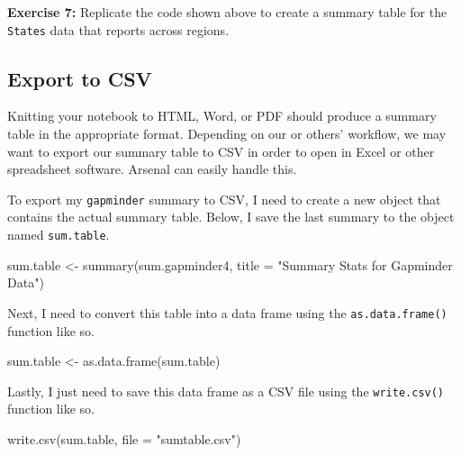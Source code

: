 \documentclass[
]{book}
\makeatletter
\newenvironment{Shaded}{\begin{snugshade}}{\end{snugshade}}
\newcommand{\AttributeTok}[1]{\textcolor[rgb]{0.61,0.61,0.61}{#1}}
\newcommand{\FunctionTok}[1]{\textcolor[rgb]{0,0,0}{#1}}
\newcommand{\NormalTok}[1]{#1}
\newcommand{\OtherTok}[1]{\textcolor[rgb]{0.37,0.37,0.37}{#1}}
\newcommand{\StringTok}[1]{\textcolor[rgb]{0.5,0.5,0.5}{#1}}
\newenvironment{kframe}{%
\medskip{}
\setlength{\fboxsep}{.8em}
 \def\at@end@of@kframe{}%
 \ifinner\ifhmode%
  \def\at@end@of@kframe{\end{minipage}}%
  \begin{minipage}{\columnwidth}%
 \fi\fi%
 \def\FrameCommand##1{\hskip\@totalleftmargin \hskip-\fboxsep
 \colorbox{shadecolor}{##1}\hskip-\fboxsep
     \hskip-\linewidth \hskip-\@totalleftmargin \hskip\columnwidth}%
 \MakeFramed {\advance\hsize-\width
   \@totalleftmargin\z@ \linewidth\hsize
   \@setminipage}}%
 {\par\unskip\endMakeFramed%
 \at@end@of@kframe}
\renewenvironment{Shaded}{\begin{kframe}}{\end{kframe}}
\newenvironment{rmdblock}[1]
  {\begin{shaded*}
  }
  {\end{shaded*}
  }
\newenvironment{learncheck}
  {\begin{rmdblock}{warning}}
  {\end{rmdblock}}
\makeatother
\begin{document}
\begin{learncheck}
\textbf{Exercise 7:} Replicate the code shown above to create a summary
table for the \texttt{States} data that reports across regions.
\end{learncheck}

\hypertarget{export-to-csv}{%
\subsection{Export to CSV}\label{export-to-csv}}

Knitting your notebook to HTML, Word, or PDF should produce a summary table in the appropriate format. Depending on our or others' workflow, we may want to export our summary table to CSV in order to open in Excel or other spreadsheet software. Arsenal can easily handle this.

To export my \texttt{gapminder} summary to CSV, I need to create a new object that contains the actual summary table. Below, I save the last summary to the object named \texttt{sum.table}.

\begin{Shaded}
\begin{Highlighting}[]
\NormalTok{sum.table }\OtherTok{\textless{}{-}} \FunctionTok{summary}\NormalTok{(sum.gapminder4, }\AttributeTok{title =} \StringTok{"Summary Stats for Gapminder Data"}\NormalTok{)}
\end{Highlighting}
\end{Shaded}

Next, I need to convert this table into a data frame using the \texttt{as.data.frame()} function like so.

\begin{Shaded}
\begin{Highlighting}[]
\NormalTok{sum.table }\OtherTok{\textless{}{-}} \FunctionTok{as.data.frame}\NormalTok{(sum.table)}
\end{Highlighting}
\end{Shaded}

Lastly, I just need to save this data frame as a CSV file using the \texttt{write.csv()} function like so.

\begin{Shaded}
\begin{Highlighting}[]
\FunctionTok{write.csv}\NormalTok{(sum.table, }\AttributeTok{file =} \StringTok{"sumtable.csv"}\NormalTok{)}
\end{Highlighting}
\end{Shaded}
\end{document}
